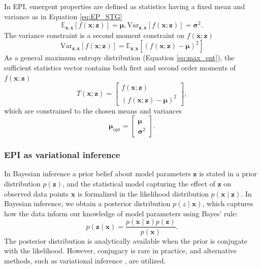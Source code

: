 \documentclass[11pt]{article}
\begin{document}
In EPI, emergent properties are defined as statistics having a fixed mean and variance as in Equation \ref{eq:EP_STG}
 \begin{equation}
\mathbb{E}_{\mathbf{z},\mathbf{x}}\left[f(\mathbf{x}; \mathbf{z})\right] = \bm{\mu}, \text{Var}_{\mathbf{z},\mathbf{x}}\left[f(\mathbf{x}; \mathbf{z})\right] = \bm{\sigma}^2.
\end{equation}
The variance constraint is a second moment constraint on $f(\mathbf{x}; \mathbf{z})$
 \begin{equation}
\text{Var}_{\mathbf{z},\mathbf{x}}\left[f(\mathbf{x}; \mathbf{z})\right] = \mathbb{E}_{\mathbf{z},\mathbf{x}}\left[\left( f(\mathbf{x}; \mathbf{z}) - \bm{\mu}\right) ^2\right]
\end{equation}
As a general maximum entropy distribution (Equation \ref{eq:max_ent}), the sufficient statistics vector contains both first and second order moments of $f(\mathbf{x}; \mathbf{z})$
\begin{equation} \label{eq:moments}
T(\mathbf{x}; \mathbf{z}) = \begin{bmatrix} f(\mathbf{x}; \mathbf{z}) \\ \left( f(\mathbf{x}; \mathbf{z}) - \bm{\mu} \right)^2 \end{bmatrix},
\end{equation}
which are constrained to the chosen means and variances
\begin{equation} \label{eq:mu_opt}
\bm{\mu}_{\text{opt}} = \begin{bmatrix} \bm{\mu} \\ \bm{\sigma}^2 \end{bmatrix}.
\end{equation}


\subsubsection{EPI as variational inference}\label{methods_VI}
In Bayesian inference a prior belief about model parameters $\mathbf{z}$ is stated in a prior distribution $p(\mathbf{z})$, and the statistical model capturing the effect of $\mathbf{z}$ on observed data points $\mathbf{x}$ is formalized in the likelihood distribution $p(\mathbf{x} \mid \mathbf{z})$.
In Bayesian inference, we obtain a posterior distribution $p(z \mid \mathbf{x})$, which captures how the data inform our knowledge of model parameters using Bayes' rule:
\begin{equation}
p(\mathbf{z} \mid \mathbf{x}) = \frac{p(\mathbf{x} \mid \mathbf{z}) p(\mathbf{z})}{p(\mathbf{x})}.
\end{equation}
The posterior distribution is analytically available when the prior is conjugate with the likelihood.
However, conjugacy is rare in practice, and alternative methods, such as variational inference \cite{blei2017variational}, are utilized.
\end{document}
